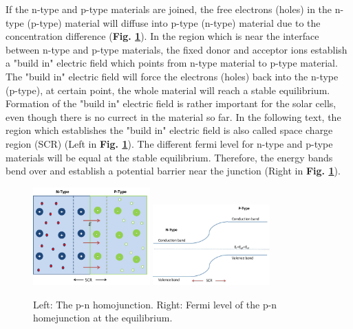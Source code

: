 \documentclass[a4paper, 12pt, titlepage,oneside,drop]{kthesis}
\begin{document}
If the n-type and p-type materials are joined, the free electrons (holes) in the n-type (p-type) material will diffuse into p-type (n-type) material due to the concentration difference (\textbf{Fig. \ref{pnjunction}}). In the region which is near the interface between n-type and
p-type materials, the fixed donor and acceptor ions establish a "build in" electric field which points from n-type material to p-type material. The "build in" electric field will force the electrons (holes) back into the n-type (p-type), at certain
point, the whole material will reach a stable equilibrium. Formation of the "build in" electric field is rather important for the solar cells, even though there is no currect in the material so far. In the following text, the region which establishes
the "build in" electric field is also called space charge region (SCR) (Left in \textbf{Fig. \ref{pnjunction}}). The different fermi level for n-type and p-type materials will be equal at the stable equilibrium. Therefore, the energy bands bend over and establish 
a potential barrier near the junction (Right in \textbf{Fig. \ref{pnjunction}}). 



\begin{figure}[H]
    \begin{center}
            \includegraphics[width=0.4\textwidth,clip]{pnjunction.jpg}
            \includegraphics[width=0.4\textwidth,clip]{pnjunction1.jpg}
     \end{center}
    \caption{Left: The p-n homojunction. Right: Fermi level of the p-n homejunction at the equilibrium. }      
    \label{pnjunction}
\end{figure}
\end{document}
